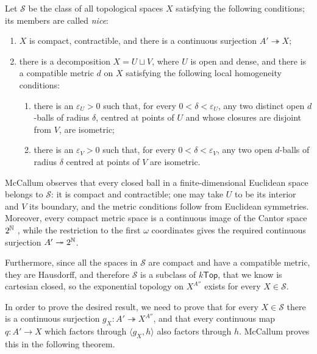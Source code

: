 \begin{definition}
    \label{def:mccallum-nice-space}
    Let $\mathcal S$ be the class of all topological spaces $X$ satisfying the following conditions; its members are called \emph{nice}:
    \begin{enumerate}[label=(\roman*)]
        \item $X$ is compact, contractible, and there is a continuous surjection $A'\twoheadrightarrow X$;
        \item there is a decomposition $X=U\sqcup V$, where $U$ is open and dense, and there is a compatible metric $d$ on $X$ satisfying the following local homogeneity conditions:
        \begin{enumerate}[label=(\alph*)]
            \item there is an $\varepsilon_U>0$ such that, for every $0<\delta<\varepsilon_U$, any two distinct open $d$-balls of radius $\delta$, centred at points of $U$ and whose closures are disjoint from $V$, are isometric;
            \item there is an $\varepsilon_V>0$ such that, for every $0<\delta<\varepsilon_V$, any two open $d$-balls of radius $\delta$ centred at points of $V$ are isometric.
        \end{enumerate}
    \end{enumerate}
\end{definition}

McCallum observes that every closed ball in a finite-dimensional Euclidean space belongs to $\mathcal S$: it is compact and contractible; one may take $U$ to be its interior and $V$ its boundary, and the metric conditions follow from Euclidean symmetries.
Moreover, every compact metric space is a continuous image of the Cantor space $2^{\mathbb{N}}$ \cite{nLabCantorSpace2026}, while the restriction to the first $\omega$ coordinates gives the required continuous surjection $A'\twoheadrightarrow 2^{\mathbb{N}}$.\par

Furthermore, since all the spaces in $\mathcal S$ are compact and have a compatible metric, they are Hausdorff, and therefore $\mathcal S$ is a subclass of $k\mathsf{Top}$, that we know is cartesian closed, so the exponential topology on $X^{A''}$ exists for every $X\in\mathcal S$.

In order to prove the desired result, we need to prove that for every $X\in\mathcal S$ there is a continuous surjection $g_X :A'\twoheadrightarrow X^{A''}$, and that every continuous map $q:A'\to X$ which factors through $\langle g_X,h\rangle$ also factors through $h$.
McCallum proves this in the following theorem.

